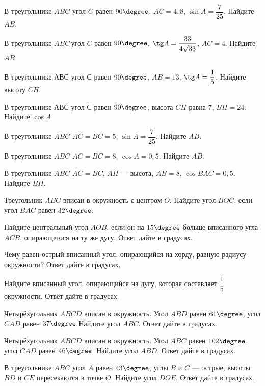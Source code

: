 \begin{class}[number=3]
	\begin{listofex}
		\item В треугольнике \( ABC \) угол \( C \) равен \( 90\degree \), \( AC = 4,8 \),  \( \sin A = \dfrac{7}{25} \).  Найдите \( AB \).
		\item В треугольнике \( ABC \) угол \( C \) равен \( 90\degree \),  \( \tg A = \dfrac{33}{4\sqrt{33}} \),  \( AC =  4 \). Найдите \( AB \).
		\item В треугольнике \( АВС \) угол \( С \) равен \( 90\degree \), \( AB = 13 \),  \( \tg A = \dfrac{1}{5} \).  Найдите высоту \( CH \).
		\item В треугольнике \( АВС \) угол \( С \) равен \( 90\degree \), высота \( CH \) равна \( 7 \), \( BH = 24 \). Найдите  \( \cos A \).
		\item В треугольнике \( ABC \) \( AC=BC=5\),  \( \sin A = \dfrac{7}{25} \).  Найдите \(AB\).
		\item В треугольнике \( ABC \) \( AC = BC = 8 \),  \( \cos A = 0,5 \). Найдите \(AB\).
		\item В треугольнике \( ABC \) \( AC = BC \), \( AH \) --- высота, \( AB = 8 \),  \( \cos BAC = 0,5 \). Найдите \( BH \).
		\item Треугольник \( ABC \) вписан в окружность с центром \( O \). Найдите угол \( BOC \), если угол \( BAC \) равен \( 32\degree \).
		\item Найдите центральный угол \( AOB \), если он на \( 15\degree \) больше вписанного угла \( ACB \), опирающегося на ту же дугу. Ответ дайте в градусах.
		\item Чему равен острый вписанный угол, опирающийся на хорду, равную радиусу окружности? Ответ дайте в градусах.
		\item Найдите вписанный угол, опирающийся на дугу, которая составляет \( \dfrac{1}{5} \) окружности. Ответ дайте в градусах.
		\item Четырёхугольник \( ABCD \) вписан в окружность. Угол \( ABD \) равен \( 61\degree \), угол \( CAD \) равен \( 37\degree \) Найдите угол \( ABC \). Ответ дайте в градусах.
		\item Четырёхугольник \( ABCD \) вписан в окружность. Угол \( ABC \) равен \( 102\degree \), угол \( CAD  \) равен \( 46\degree \). Найдите угол \( ABD \). Ответ дайте в градусах.
		\item В треугольнике \( ABC \) угол \( A \) равен \( 43\degree \), углы \( B \) и \( C \) --- острые, высоты \( BD \) и \( CE \) пересекаются в точке \( O \). Найдите угол \( DOE \). Ответ дайте в градусах.
	\end{listofex}
\end{class}

